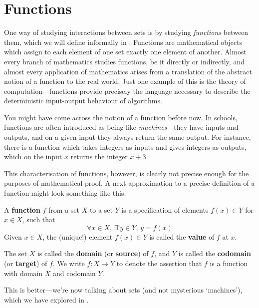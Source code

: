\section{Functions}

One way of studying interactions between sets is by studying \textit{functions} between them, which we will define informally in . Functions are mathematical objects which assign to each element of one set exactly one element of another. Almost every branch of mathematics studies functions, be it directly or indirectly, and almost every application of mathematics arises from a translation of the abstract notion of a function to the real world. Just one example of this is the theory of computation---functions provide precisely the language necessary to describe the deterministic input-output behaviour of algorithms.

You might have come across the notion of a function before now. In schools, functions are often introduced as being like \textit{machines}---they have inputs and outputs, and on a given input they always return the same output. For instance, there is a function which takes integers as inputs and gives integers as outputs, which on the input $x$ returns the integer $x+3$.

This characterisation of functions, however, is clearly not precise enough for the purposes of mathematical proof. A next approximation to a precise definition of a function might look something like this:

\begin{definition}
\label{defFunction}
A \textbf{function} $f$ from a set $X$ to a set $Y$ is a specification of elements $f(x) \in Y$ for $x \in X$, such that
\[ \forall x \in X,\, \exists ! y \in Y,\, y = f(x) \]
Given $x \in X$, the (unique!) element $f(x) \in Y$ is called the \textbf{value} of $f$ at $x$.

The set $X$ is called the \textbf{domain} (or \textbf{source}) of $f$, and $Y$ is called the \textbf{codomain} (or \textbf{target}) of $f$. We write $f : X \to Y$  to denote the assertion that $f$ is a function with domain $X$ and codomain $Y$.
\end{definition}

This is better---we're now talking about sets (and not mysterious `machines'), which we have explored in .

